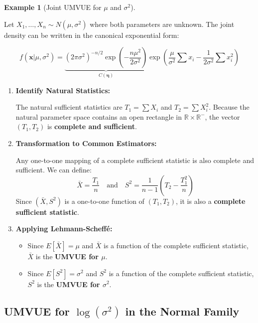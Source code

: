 \documentclass[
  letterpaper,
  DIV=11,
  numbers=noendperiod]{scrreprt}
\providecommand{\tightlist}{%
  \setlength{\itemsep}{0pt}\setlength{\parskip}{0pt}}
\renewcommand{\[}{\begin{equation}}
\renewcommand{\]}{\end{equation}}
\theoremstyle{definition}
\theoremstyle{plain}
\theoremstyle{plain}
\theoremstyle{plain}
\theoremstyle{definition}
\newtheorem{example}{Example}[chapter]
\theoremstyle{plain}
\theoremstyle{remark}
\begin{document}
\begin{example}[Joint UMVUE for \(\mu\) and
\(\sigma^2\)]\protect\hypertarget{exm-normal-joint-umvue}{}\label{exm-normal-joint-umvue}

Let \(X_1, \dots, X_n \sim N(\mu, \sigma^2)\) where both parameters are
unknown. The joint density can be written in the canonical exponential
form:

\[f(\mathbf{x}|\mu, \sigma^2) = \underbrace{(2\pi\sigma^2)^{-n/2} \exp\left(-\frac{n\mu^2}{2\sigma^2}\right)}_{C(\boldsymbol{\eta})} \exp\left( \frac{\mu}{\sigma^2}\sum x_i - \frac{1}{2\sigma^2}\sum x_i^2 \right)\]

\begin{enumerate}
\def\labelenumi{\arabic{enumi}.}
\item
  \textbf{Identify Natural Statistics:}

  The natural sufficient statistics are \(T_1 = \sum X_i\) and
  \(T_2 = \sum X_i^2\). Because the natural parameter space contains an
  open rectangle in \(\mathbb{R} \times \mathbb{R}^-\), the vector
  \((T_1, T_2)\) is \textbf{complete and sufficient}.
\item
  \textbf{Transformation to Common Estimators:}

  Any one-to-one mapping of a complete sufficient statistic is also
  complete and sufficient. We can define:
  \[\bar{X} = \frac{T_1}{n} \quad \text{and} \quad S^2 = \frac{1}{n-1}\left( T_2 - \frac{T_1^2}{n} \right)\]
  Since \((\bar{X}, S^2)\) is a one-to-one function of \((T_1, T_2)\),
  it is also a \textbf{complete sufficient statistic}.
\item
  \textbf{Applying Lehmann-Scheffé:}

  \begin{itemize}
  \tightlist
  \item
    Since \(E[\bar{X}] = \mu\) and \(\bar{X}\) is a function of the
    complete sufficient statistic, \(\bar{X}\) is the \textbf{UMVUE for
    \(\mu\)}.
  \item
    Since \(E[S^2] = \sigma^2\) and \(S^2\) is a function of the
    complete sufficient statistic, \(S^2\) is the \textbf{UMVUE for
    \(\sigma^2\)}.
  \end{itemize}
\end{enumerate}

\end{example}

\subsection{\texorpdfstring{UMVUE for \(\log(\sigma^2)\) in the Normal
Family}{UMVUE for \textbackslash log(\textbackslash sigma\^{}2) in the Normal Family}}\label{umvue-for-logsigma2-in-the-normal-family}
\end{document}
